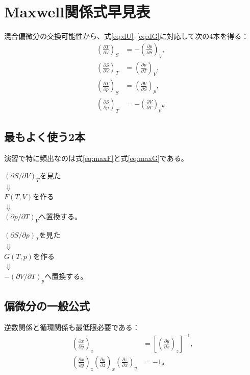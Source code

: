 \documentclass[platex,dvipdfmx,a4paper,10pt]{jsarticle}
\newcommand{\flow}[1]{\begin{center}\begin{minipage}{0.94\textwidth}\centering #1\end{minipage}\end{center}}
\begin{document}
\section{Maxwell関係式早見表}\label{sec:maxwell}
混合偏微分の交換可能性から、式\eqref{eq:dU}--\eqref{eq:dG}に対応して次の4本を得る：
\begin{align}
  \left(\frac{\partial T}{\partial V}\right)_S
  &=-\left(\frac{\partial p}{\partial S}\right)_V,\label{eq:maxU}\\
  \left(\frac{\partial S}{\partial V}\right)_T
  &=\left(\frac{\partial p}{\partial T}\right)_V,\label{eq:maxF}\\
  \left(\frac{\partial T}{\partial p}\right)_S
  &=\left(\frac{\partial V}{\partial S}\right)_p,\label{eq:maxH}\\
  \left(\frac{\partial S}{\partial p}\right)_T
  &=-\left(\frac{\partial V}{\partial T}\right)_p。\label{eq:maxG}
\end{align}

\subsection{最もよく使う2本}
演習で特に頻出なのは式\eqref{eq:maxF}と式\eqref{eq:maxG}である。
\flow{$(\partial S/\partial V)_T$を見た\\$\Downarrow$\\$F(T,V)$を作る\\$\Downarrow$\\$(\partial p/\partial T)_V$へ置換する。}
\flow{$(\partial S/\partial p)_T$を見た\\$\Downarrow$\\$G(T,p)$を作る\\$\Downarrow$\\$-(\partial V/\partial T)_p$へ置換する。}

\subsection{偏微分の一般公式}
逆数関係と循環関係も最低限必要である：
\begin{align}
  \left(\frac{\partial x}{\partial y}\right)_z
  &=\left[\left(\frac{\partial y}{\partial x}\right)_z\right]^{-1},\label{eq:reciprocal}\\
  \left(\frac{\partial x}{\partial y}\right)_z
  \left(\frac{\partial y}{\partial z}\right)_x
  \left(\frac{\partial z}{\partial x}\right)_y&=-1。\label{eq:cyclic}
\end{align}
\end{document}
